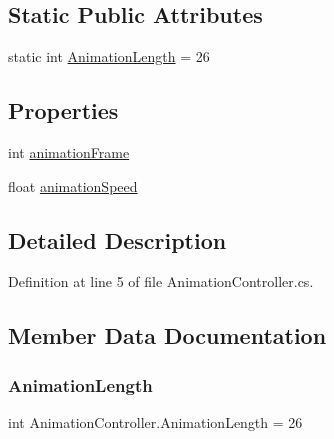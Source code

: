 \subsection*{Static Public Attributes}
\begin{DoxyCompactItemize}
\item 
static int \mbox{\hyperlink{class_animation_controller_a0bbb9c9004069afb3c2ac4600cbd79fc}{Animation\+Length}} = 26
\end{DoxyCompactItemize}
\subsection*{Properties}
\begin{DoxyCompactItemize}
\item 
int \mbox{\hyperlink{class_animation_controller_a97a1baad1d6f5f5e48145cad30ec8d16}{animation\+Frame}}
\item 
float \mbox{\hyperlink{class_animation_controller_a9a5d475137de1a9cb890396d404104a4}{animation\+Speed}}
\end{DoxyCompactItemize}


\subsection{Detailed Description}


Definition at line 5 of file Animation\+Controller.\+cs.



\subsection{Member Data Documentation}
\mbox{\label{class_animation_controller_a0bbb9c9004069afb3c2ac4600cbd79fc}} 
\subsubsection{\texorpdfstring{AnimationLength}{AnimationLength}}
{\footnotesize\ttfamily int Animation\+Controller.\+Animation\+Length = 26\hspace{0.3cm}{\ttfamily [static]}}



